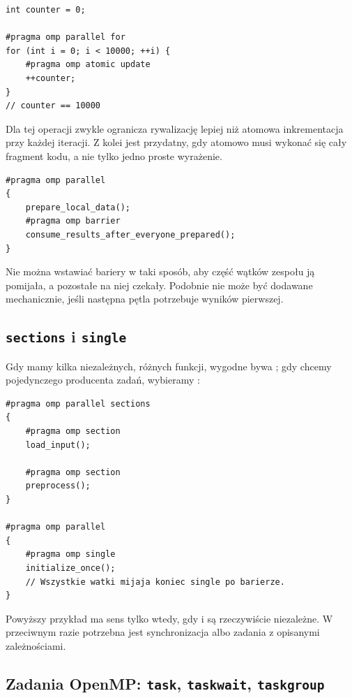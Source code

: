 \begin{lstlisting}[caption={Dwie alternatywy zwiększania licznika.}]
int counter = 0;

#pragma omp parallel for
for (int i = 0; i < 10000; ++i) {
    #pragma omp atomic update
    ++counter;
}
// counter == 10000
\end{lstlisting}

Dla tej operacji  zwykle ogranicza
rywalizację lepiej niż atomowa inkrementacja przy każdej iteracji.
Z kolei  jest przydatny, gdy atomowo musi wykonać się
cały fragment kodu, a nie tylko jedno proste wyrażenie.

\begin{lstlisting}[caption={Bariera wewnątrz istniejącego zespołu.}]
#pragma omp parallel
{
    prepare_local_data();
    #pragma omp barrier
    consume_results_after_everyone_prepared();
}
\end{lstlisting}

Nie można wstawiać bariery w taki sposób, aby część wątków zespołu
ją pomijała, a pozostałe na niej czekały. Podobnie 
nie może być dodawane mechanicznie, jeśli następna pętla potrzebuje
wyników pierwszej.

\subsection{\texttt{sections} i \texttt{single}}

Gdy mamy kilka niezależnych, różnych funkcji, wygodne bywa
; gdy chcemy pojedynczego producenta zadań,
wybieramy :

\begin{lstlisting}[caption={Kilka różnych zadań i jedna sekcja inicjalizacyjna.}]
#pragma omp parallel sections
{
    #pragma omp section
    load_input();

    #pragma omp section
    preprocess();
}

#pragma omp parallel
{
    #pragma omp single
    initialize_once();
    // Wszystkie watki mijaja koniec single po barierze.
}
\end{lstlisting}

Powyższy przykład  ma sens tylko wtedy, gdy
 i  są rzeczywiście niezależne.
W przeciwnym razie potrzebna jest synchronizacja albo zadania
z opisanymi zależnościami.

\subsection{Zadania OpenMP: \texttt{task}, \texttt{taskwait}, \texttt{taskgroup}}

